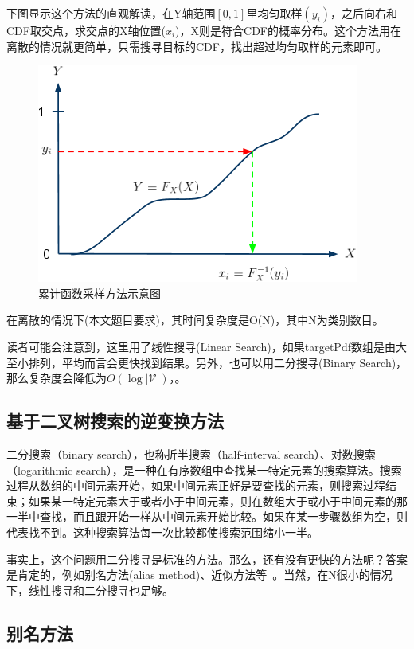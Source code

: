 下图显示这个方法的直观解读，在Y轴范围$[0,1]$里均匀取样$(y_i)$，之后向右和CDF取交点，求交点的X轴位置($x_i$)，X则是符合CDF的概率分布。这个方法用在离散的情况就更简单，只需搜寻目标的CDF，找出超过均匀取样的元素即可。
\begin{figure}[!h]
  \centering
\includegraphics[width=0.5\linewidth]{./figures/cdf.png}
\caption{累计函数采样方法示意图}\label{fig:cdf}
\end{figure}
在离散的情况下(本文题目要求)，其时间复杂度是O(N)，其中N为类别数目。

读者可能会注意到，这里用了线性搜寻(Linear Search)，如果targetPdf数组是由大至小排列，平均而言会更快找到结果。另外，也可以用二分搜寻(Binary Search)，那么复杂度会降低为$O(\log |\mathcal{V}|)$，。


\subsection{基于二叉树搜索的逆变换方法}
二分搜索（binary search），也称折半搜索（half-interval search）、对数搜索（logarithmic search），是一种在有序数组中查找某一特定元素的搜索算法。搜索过程从数组的中间元素开始，如果中间元素正好是要查找的元素，则搜索过程结束；如果某一特定元素大于或者小于中间元素，则在数组大于或小于中间元素的那一半中查找，而且跟开始一样从中间元素开始比较。如果在某一步骤数组为空，则代表找不到。这种搜索算法每一次比较都使搜索范围缩小一半。

事实上，这个问题用二分搜寻是标准的方法。那么，还有没有更快的方法呢？答案是肯定的，例如别名方法(alias method)、近似方法等~。当然，在N很小的情况下，线性搜寻和二分搜寻也足够。
\subsection{别名方法}

